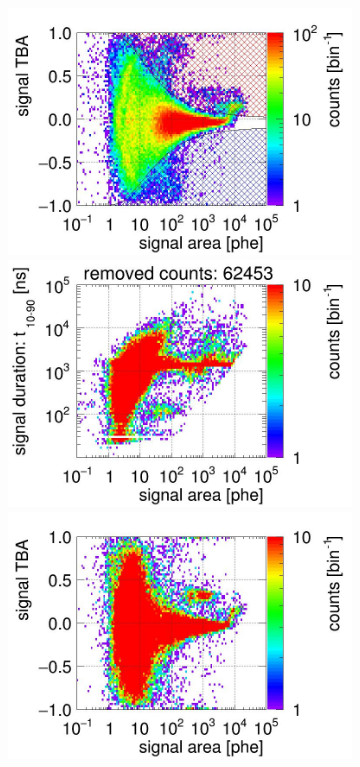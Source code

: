 \begin{landscape}
\begin{figure}[!p]
\begin{subfigure}[t]{0.33\textwidth}
			\includegraphics[width=\figurewidth,clip,trim={0 98 0 40}]{Figures/GasTest/CutsValid/res64771/tbapa26Vecfig64771.jpg}
			\includegraphics[width=\figurewidth,clip,trim={0 98 0 10}]{Figures/GasTest/CutsValid/res64771/pdpaX26Vecfig64771.jpg}
			\includegraphics[width=\figurewidth,clip,trim={0 0 0 40}]{Figures/GasTest/CutsValid/res64771/tbapaX26Vecfig64771.jpg}

\end{subfigure}
\end{figure}
\end{landscape}
